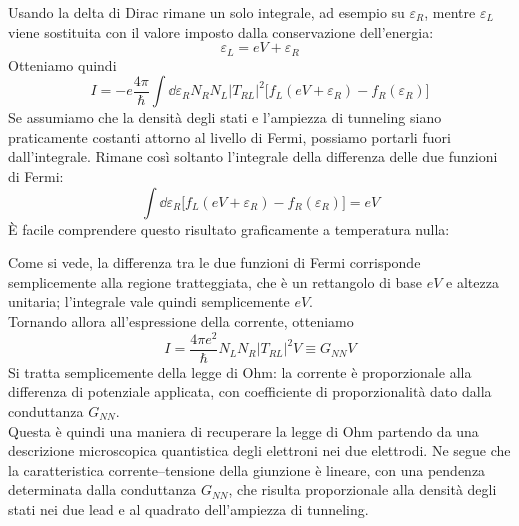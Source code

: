 Usando la delta di Dirac rimane un solo integrale, ad esempio su $\varepsilon_R$, mentre $\varepsilon_L$ viene sostituita con il valore imposto dalla conservazione dell'energia:
\begin{equation*}
    \varepsilon_L=eV+\varepsilon_R
\end{equation*}
Otteniamo quindi
\begin{equation*}
    I = -e \frac{4\pi}{\hbar} \int \dd{\varepsilon_R} N_R N_L |T_{RL}|^2
    \bigl[ f_L(eV+\varepsilon_R) - f_R(\varepsilon_R) \bigr]
\end{equation*}
Se assumiamo che la densità degli stati e l'ampiezza di tunneling siano praticamente costanti attorno al livello di Fermi, possiamo portarli fuori dall'integrale. Rimane così soltanto l'integrale della differenza delle due funzioni di Fermi:
\begin{equation*}
    \int \dd{\varepsilon_R} \bigl[ f_L(eV+\varepsilon_R) - f_R(\varepsilon_R) \bigr] = eV
\end{equation*}
È facile comprendere questo risultato graficamente a temperatura nulla:
\begin{figure}[H]
    \centering
\end{figure}
\hspace{-0.6cm}Come si vede, la differenza tra le due funzioni di Fermi corrisponde semplicemente alla regione tratteggiata, che è un rettangolo di base $eV$ e altezza unitaria; l'integrale vale quindi semplicemente $eV$.\\
Tornando allora all'espressione della corrente, otteniamo
\begin{equation*}
    I
    =\frac{4\pi e^2}{\hbar}N_LN_R|T_{RL}|^2V
    \equiv G_{NN}V
\end{equation*}
Si tratta semplicemente della legge di Ohm: la corrente è proporzionale alla differenza di potenziale applicata, con coefficiente di proporzionalità dato dalla conduttanza $G_{NN}$.\\
Questa è quindi una maniera di recuperare la legge di Ohm partendo da una descrizione microscopica quantistica degli elettroni nei due elettrodi. Ne segue che la caratteristica corrente--tensione della giunzione è lineare, con una pendenza determinata dalla conduttanza $G_{NN}$, che risulta proporzionale alla densità degli stati nei due lead e al quadrato dell'ampiezza di tunneling.
